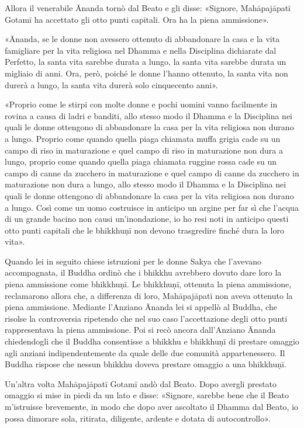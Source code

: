Allora il venerabile Ānanda tornò dal Beato e gli disse: «Signore,
Mahāpajāpatī Gotamī ha accettato gli otto punti capitali. Ora ha la
piena ammissione».


«Ānanda, se le donne non avessero ottenuto di abbandonare la casa e la
vita famigliare per la vita religiosa nel Dhamma e nella Disciplina
dichiarate dal Perfetto, la santa vita sarebbe durata a lungo, la santa
vita sarebbe durata un migliaio di anni. Ora, però, poiché le donne
l’hanno ottenuto, la santa vita non durerà a lungo, la santa vita durerà
solo cinquecento anni».


«Proprio come le stirpi con molte donne e pochi uomini vanno facilmente
in rovina a causa di ladri e banditi, allo stesso modo il Dhamma e la
Disciplina nei quali le donne ottengono di abbandonare la casa per la
vita religiosa non durano a lungo. Proprio come quando quella piaga
chiamata muffa grigia cade su un campo di riso in maturazione e quel
campo di riso in maturazione non dura a lungo, proprio come quando
quella piaga chiamata ruggine rossa cade su un campo di canne da
zucchero in maturazione e quel campo di canne da zucchero in maturazione
non dura a lungo, allo stesso modo il Dhamma e la Disciplina nei quali
le donne ottengono di abbandonare la casa per la vita religiosa non
durano a lungo. Così come un uomo costruisce in anticipo un argine per
far sì che l’acqua di un grande bacino non causi un’inondazione, io ho
resi noti in anticipo questi otto punti capitali che le bhikkhuṇī non
devono trasgredire finché dura la loro vita».




 Quando lei in seguito chiese istruzioni per le donne
Sakya che l’avevano accompagnata, il Buddha ordinò che i bhikkhu
avrebbero dovuto dare loro la piena ammissione come bhikkhuṇī. Le
bhikkhuṇī, ottenuta la piena ammissione, reclamarono allora che, a
differenza di loro, Mahāpajāpatī non aveva ottenuto la piena ammissione.
Mediante l’Anziano Ānanda lei si appellò al Buddha, che risolse la
controversia ripetendo che nel suo caso l’accettazione degli otto punti
rappresentava la piena ammissione. Poi si recò ancora dall’Anziano
Ānanda chiedendogli che il Buddha consentisse a bhikkhu e bhikkhuṇī di
prestare omaggio agli anziani indipendentemente da quale delle due
comunità appartenessero. Il Buddha rispose che nessun bhikkhu doveva
prestare omaggio a una bhikkhuṇī.


 Un’altra volta Mahāpajāpatī Gotamī andò dal Beato. Dopo
avergli prestato omaggio si mise in piedi da un lato e disse: «Signore,
sarebbe bene che il Beato m’istruisse brevemente, in modo che dopo aver
ascoltato il Dhamma dal Beato, io possa dimorare sola, ritirata,
diligente, ardente e dotata di autocontrollo».


